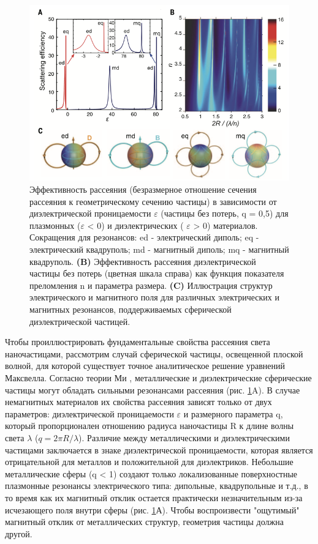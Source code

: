  \begin{figure}[h!]
	\centering
	\includegraphics[width=0.7\linewidth]{images/fig1.png}
	\caption{Эффективность рассеяния (безразмерное отношение сечения рассеяния к геометрическому сечению частицы) в зависимости от диэлектрической проницаемости $\varepsilon$ (частицы без потерь, q = 0,5) для плазмонных ($\varepsilon$  < 0) и диэлектрических ( $\varepsilon$ > 0) материалов. Сокращения для резонансов: ed - электрический диполь; eq - электрический квадруполь; md - магнитный диполь; mq - магнитный квадруполь. \textbf{(B)} Эффективность рассеяния диэлектрической частицы без потерь (цветная шкала справа) как функция показателя преломления n и параметра размера. \textbf{(C)} Иллюстрация структур электрического и магнитного поля для различных электрических и магнитных резонансов, поддерживаемых сферической диэлектрической частицей.}
	\label{fig1}
\end{figure}
\hspace*{2mm}
Чтобы проиллюстрировать фундаментальные свойства рассеяния света наночастицами, рассмотрим случай сферической частицы, освещенной плоской волной, для которой существует точное аналитическое решение уравнений Максвелла. Согласно теории Ми \cite{absorbScattLight}, металлические и диэлектрические сферические частицы могут обладать сильными резонансами рассеяния (рис. \ref{fig1}A). В случае немагнитных материалов их свойства рассеяния зависят только от двух параметров: диэлектрической проницаемости $\varepsilon$  и размерного параметра q, который пропорционален отношению радиуса наночастицы R к длине волны света $\lambda$ ($q = 2\pi R/\lambda$). Различие между металлическими и диэлектрическими частицами заключается в знаке диэлектрической проницаемости, которая является отрицательной для металлов и положительной для диэлектриков. Небольшие металлические сферы (q < 1) создают только локализованные поверхностные плазмонные резонансы электрического типа:  дипольные, квадрупольные и т.д., в то время как их магнитный отклик остается практически незначительным из-за исчезающего поля внутри сферы (рис. \ref{fig1}А).  Чтобы воспроизвести "ощутимый" магнитный отклик от металлических структур, геометрия частицы должна другой. 
